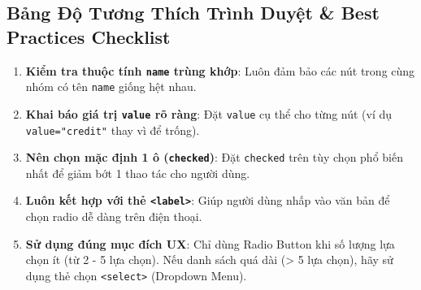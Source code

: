 \documentclass[11pt,oneside]{book}
\newcommand{\thd}[1]{\textcolor{white}{\textbf{\strut #1}}}
\newcommand{\codeinline}[1]{\textcolor{accentOrange}{\texttt{#1}}}
\begin{document}
\subsection{Bảng Độ Tương Thích Trình Duyệt \& Best Practices Checklist}

\begin{prettyTableBox}
\end{prettyTableBox}

\begin{tipBox}
\begin{enumerate}[leftmargin=1.5em, itemsep=2pt, parsep=0pt]
    \item \textbf{Kiểm tra thuộc tính \codeinline{name} trùng khớp}: Luôn đảm bảo các nút trong cùng nhóm có tên \codeinline{name} giống hệt nhau.
    \item \textbf{Khai báo giá trị \codeinline{value} rõ ràng}: Đặt \codeinline{value} cụ thể cho từng nút (ví dụ \codeinline{value="credit"} thay vì để trống).
    \item \textbf{Nên chọn mặc định 1 ô (\codeinline{checked})}: Đặt \codeinline{checked} trên tùy chọn phổ biến nhất để giảm bớt 1 thao tác cho người dùng.
    \item \textbf{Luôn kết hợp với thẻ \codeinline{<label>}}: Giúp người dùng nhấp vào văn bản để chọn radio dễ dàng trên điện thoại.
    \item \textbf{Sử dụng đúng mục đích UX}: Chỉ dùng Radio Button khi số lượng lựa chọn ít (từ 2 - 5 lựa chọn). Nếu danh sách quá dài (> 5 lựa chọn), hãy sử dụng thẻ chọn \codeinline{<select>} (Dropdown Menu).
\end{enumerate}
\end{tipBox}
\end{document}
